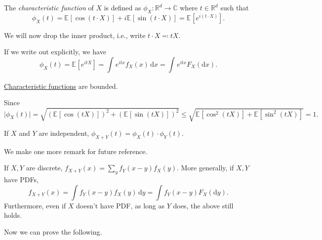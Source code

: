 \begin{definition}\label{def:characteristic-function}
	The \emph{characteristic function} of \(X\) is defined as \(\phi _X \colon \mathbb{R} ^d \to \mathbb{C} \) where \(t\in \mathbb{R} ^d\) such that
	\[
		\phi _X(t) = \mathbb{E}_{}[\cos (t \cdot X)] + i \mathbb{E}_{}[\sin (t \cdot X)] = \mathbb{E}_{}[e^{i (t \cdot X)}] .
	\]
\end{definition}

\begin{notation}
	We will now drop the inner product, i.e., write \(t\cdot X \eqqcolon t X\).
\end{notation}

If we write out explicitly, we have
\[
	\phi _X(t)
	= \mathbb{E}_{}[e^{i t X}]
	= \int_{}^{} e^{i t x} f_X(x)\,\mathrm{d}x
	= \int_{}^{} e^{i t x} F_X(\mathrm{d} x).
\]

\begin{remark}
	\hyperref[def:characteristic-function]{Characteristic functions} are bounded.
\end{remark}
\begin{explanation}
	Since
	\[
		\vert \phi _X(t) \vert
		= \sqrt{\left( \mathbb{E}_{}[\cos (t X)] \right)^2 + \left( \mathbb{E}_{}[\sin (t X)] \right)^2 }
		\leq \sqrt{\mathbb{E}_{}[\cos ^2(t X)] + \mathbb{E}_{}[\sin ^2(t X)] }
		= 1.
	\]
\end{explanation}

\begin{remark}
	If \(X\) and \(Y\) are independent, \(\phi _{X + Y}(t) = \phi _X(t) \cdot \phi _Y(t)\).
\end{remark}

We make one more remark for future reference.

\begin{remark}\label{rmk:lec8}
	If \(X, Y\) are discrete, \(f_{X + Y} (x) = \sum_{y} f_Y(x - y) f_X(y)\). More generally, if \(X, Y\) have PDFs,
	\[
		f_{X + Y}(x) = \int f_Y(x - y) f_X(y) \,\mathrm{d} y = \int f_Y(x - y) F_X(\mathrm{d} y) .
	\]
	Furthermore, even if \(X\) doesn't have PDF, as long as \(Y\) does, the above still holds.
\end{remark}

Now we can prove the following.

